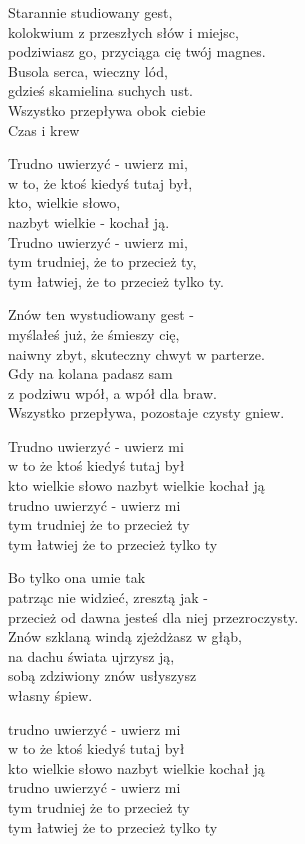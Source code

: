 \begin{text}
    Starannie studiowany gest,\\
    kolokwium z przeszłych słów i miejsc,\\
    podziwiasz go, przyciąga cię twój magnes.\\
    Busola serca, wieczny lód,\\
    gdzieś skamielina suchych ust.\\
    Wszystko przepływa obok ciebie\\
    Czas i krew

    Trudno uwierzyć - uwierz mi,\\
    w to, że ktoś kiedyś tutaj był,\\
    kto, wielkie słowo,\\
    nazbyt wielkie - kochał ją.\\
    Trudno uwierzyć - uwierz mi,\\
    tym trudniej, że to przecież ty,\\
    tym łatwiej, że to przecież tylko ty.

    Znów ten wystudiowany gest -\\
    myślałeś już, że śmieszy cię,\\
    naiwny zbyt, skuteczny chwyt w parterze.\\
    Gdy na kolana padasz sam\\
    z podziwu wpół, a wpół dla braw.\\
    Wszystko przepływa, pozostaje czysty gniew.

    Trudno uwierzyć - uwierz mi\\
    w to że ktoś kiedyś tutaj był\\
    kto wielkie słowo nazbyt wielkie kochał ją\\
    trudno uwierzyć - uwierz mi\\
    tym trudniej że to przecież ty\\
    tym łatwiej że to przecież tylko ty

    Bo tylko ona umie tak\\
    patrząc nie widzieć, zresztą jak -\\
    przecież od dawna jesteś dla niej przezroczysty.\\
    Znów szklaną windą zjeżdżasz w głąb,\\
    na dachu świata ujrzysz ją,\\
    sobą zdziwiony znów usłyszysz\\
    własny śpiew.

    trudno uwierzyć - uwierz mi\\
    w to że ktoś kiedyś tutaj był\\
    kto wielkie słowo nazbyt wielkie kochał ją\\
    trudno uwierzyć - uwierz mi\\
    tym trudniej że to przecież ty\\
    tym łatwiej że to przecież tylko ty
\end{text}
